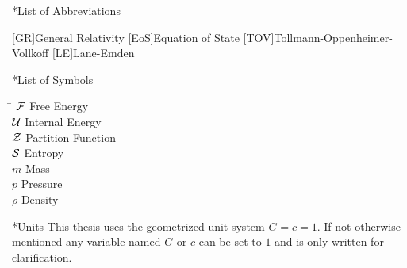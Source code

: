 \begin{section}*{List of Abbreviations}

\begin{acronym}[TOV]
	[GR]{General Relativity}
	[EoS]{Equation of State}
	[TOV]{Tollmann-Oppenheimer-Vollkoff}
	[LE]{Lane-Emden}
\end{acronym}


\end{section}
\begin{section}*{List of Symbols}
\begin{tabbing}
\hspace{2cm}\=\kill
$\mathcal{F}$				\> Free Energy\\
$\mathcal{U}$				\> Internal Energy\\
$\mathcal{Z}$				\> Partition Function\\
$\mathcal{S}$				\> Entropy\\
$m$					\> Mass\\
$p$					\> Pressure\\
$\rho$				\> Density
\end{tabbing}

\end{section}

\begin{section}*{Units}
This thesis uses the geometrized unit system $G=c=1$.
If not otherwise mentioned any variable named $G$ or $c$ can be set to $1$ and is only written for clarification.
\end{section}
